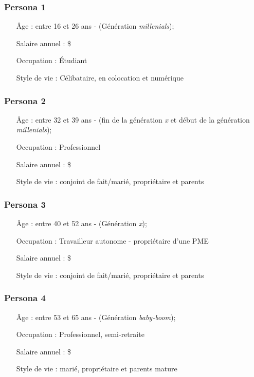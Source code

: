 \documentclass[11pt,french]{report}\usepackage[]{graphicx}\usepackage[]{color}
\begin{document}
\subsubsection*{Persona 1}
\label{per1}
\begin{itemize}
\item[Âge :] entre 16 et 26 ans - (Génération \emph{millenials});
\item[Salaire annuel :]  \$
\item[Occupation :] Étudiant
\item[Style de vie : ] Célibataire, en colocation et numérique
\end{itemize}

\subsubsection*{Persona 2}
\label{per2}
\begin{itemize}
\item[Âge :] entre 32 et 39 ans - (fin de la génération \emph{x} et début de la génération \emph{millenials});
\item[Occupation :] Professionnel
\item[Salaire annuel :]  \$
\item[Style de vie : ] conjoint de fait/marié, propriétaire et parents
\end{itemize}

\subsubsection*{Persona 3}
\label{per3}
\begin{itemize}
\item[Âge :] entre 40 et 52 ans - (Génération \emph{x});
\item[Occupation :] Travailleur autonome - propriétaire d'une PME
\item[Salaire annuel :]  \$
\item[Style de vie : ] conjoint de fait/marié, propriétaire et parents
\end{itemize}

\subsubsection*{Persona 4}
\label{per4}
\begin{itemize}
\item[Âge :] entre 53 et 65 ans - (Génération \emph{baby-boom});
\item[Occupation :] Professionnel, semi-retraite
\item[Salaire annuel :]  \$
\item[Style de vie : ] marié, propriétaire et parents mature
\end{itemize}
\end{document}

